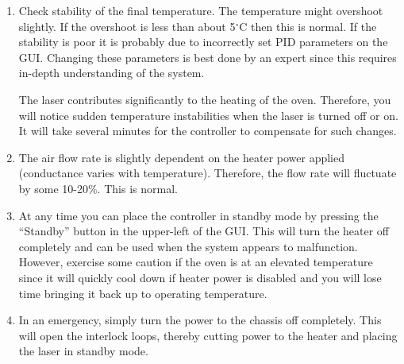 {\begin{enumerate}
In controlling the Oven Temperature from the GUI, you must enter a new
temperature setpoint by hand at fixed time intervals.  Enter the desired
setpoint in the ``SP1'' enter box in the lower right of the GUI.  
You should increase the  value by 10$^\circ$C every 10 minutes. 
For example, if the current oven temperature is 35$^\circ$C, start with 
a setpoint of 45$^\circ$C and increase this
value by 10$^\circ$C in approximately 10 minute intervals.
The heater is controlled in PID (proportional, integral, derivative) mode.
It approaches the setpoint according to the PID parameters defined in
the ``Prop. Band'', ``Reset'' and ``Rate'' boxes in the lower-right
of the GUI.  These values can be changed, but the defaults should be 
fine except for special circumstances.
\item Check stability of the final temperature. 
  The temperature might overshoot slightly. If the overshoot is
  less than about 5$^\circ$C then this is normal. If the stability is
  poor it is probably due to incorrectly set PID parameters on the
  GUI.  Changing these parameters is best done by an expert since this 
  requires in-depth understanding of the system.

  The laser contributes significantly to the heating of the oven.
  Therefore, you will notice sudden temperature instabilities when
  the laser is turned off or on. It will take several minutes for
  the controller to compensate for such changes.

\item The air flow rate is slightly dependent on the heater power
  applied (conductance varies with temperature). 
  Therefore, the flow rate will fluctuate by some 10-20\%. This is
  normal.


\item At any time you can place the controller in standby mode by pressing
the ``Standby'' button in the upper-left of the GUI.  
  This will turn the heater off completely and can be used
  when the system appears to malfunction.   However, exercise some
  caution if the oven is at an elevated temperature since it will quickly 
  cool down if heater power is disabled and you will lose time bringing
  it back up to operating temperature.


\item In an emergency, simply turn the power to the chassis off completely.
  This will open the interlock loops, thereby cutting power to the heater
  and placing the laser in standby mode.

\end{enumerate}
} %
